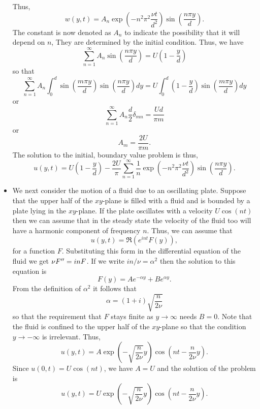 \begin{itemize}
Thus,
\begin{equation}\label{c4s3e25}
w(y, t) = A_n\exp\left(-n^2\pi^2\frac{\nu t}{d^2}\right)\sin\left(\frac{n\pi y}{d}\right).
\end{equation}
The constant is now denoted as $A_n$ to indicate the possibility that it will depend on $n$, They are determined by
the initial condition. Thus, we have
\[
\sum_{n=1}^\infty A_n\sin\left(\frac{n\pi y}{d}\right) = U\left(1 - \frac{y}{d}\right)
\]
so that
\[
\sum_{n=1}^\infty A_n\int_0^d\sin\left(\frac{m\pi y}{d}\right)\sin\left(\frac{n\pi y}{d}\right)dy = U\int_0^d\left(1 - \frac{y}{d}\right)\sin\left(\frac{m\pi y}{d}\right)dy
\]
or
\[
\sum_{n=1}^\infty A_n \frac{d}{2}\delta_{mn} = \frac{Ud}{\pi m}
\]
or
\begin{equation}\label{c4s3e26}
A_m = \frac{2U}{\pi m}.
\end{equation}
The solution to the initial, boundary value problem is thus,
\begin{equation}\label{c4s3e27}
u(y, t) = U\left(1 - \frac{y}{d}\right) - \frac{2U}{\pi}\sum_{n=1}^\infty \frac{1}{n}\exp\left(-n^2\pi^2\frac{\nu t}{d^2}\right)\sin\left(\frac{n\pi y}{d}\right).
\end{equation}

\item We next consider the motion of a fluid due to an oscillating plate. Suppose that the upper half of the
$xy$-plane is filled with a fluid and is bounded by a plate lying in the $xy$-plane. If the plate oscillates
with a velocity $U\cos(nt)$ then we can assume that in the steady state the velocity of the fluid too will
have a harmonic component of frequency $n$. Thus, we can assume that
\[
u(y, t) = \Re(e^{int}F(y)),
\]
for a function $F$. Substituting this form in the differential equation of the fluid we get $\nu F^{{\prime\prime}} =
inF$. If we write $in/\nu = \alpha^2$ then the solution to this equation is
\[
F(y) = A e^{-\alpha y} + Be^{\alpha y}.
\]
From the definition of $\alpha^2$ it follows that
\[
\alpha = (1 + i)\sqrt{\frac{n}{2\nu}}
\]
so that the requirement that $F$ stays finite as $y \rightarrow \infty$ needs $B = 0$. Note that the fluid
is confined to the upper half of the $xy$-plane so that the condition $y \rightarrow -\infty$ is irrelevant.
Thus,
\[
u(y, t) = A\exp\left(-\sqrt{\frac{n}{2\nu}}y\right)\cos\left(nt - \frac{n}{2\nu}y\right).
\]
Since $u(0, t) = U\cos(nt)$, we have $A = U$ and the solution of the problem is
\begin{equation}\label{c4s3e28}
u(y, t) = U\exp\left(-\sqrt{\frac{n}{2\nu}}y\right)\cos\left(nt - \frac{n}{2\nu}y\right).
\end{equation}


\end{itemize}
